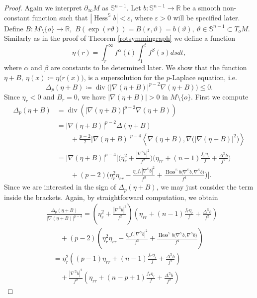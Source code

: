 \documentclass[10pt,a4paper,reqno]{amsart}
\newcommand{\R}{\mathbb{R}}
\newcommand{\Ss}{\mathbb{S}}
\newcommand{\ang}[1]{\left\langle #1 \right\rangle}
\DeclareMathOperator\dv{div}
\newcommand{\pinf}{\partial_{\infty}}
\DeclareMathOperator\Hess{Hess}
\numberwithin{equation}{section}
\theoremstyle{plain}
\theoremstyle{definition}
\begin{document}
\begin{proof}
 Again we interpret $\pinf M$ as $\Ss^{n-1}$. Let $b\colon \Ss^{n-1} \to \R$ be a smooth non-constant 
 function such that $|\Hess^{\Ss}b|<\varepsilon$, where $\varepsilon>0$ will be specified later. 
 Define $B\colon M \setminus 
\{o\} \to \R,$ $B(\exp(r\vartheta))=B(r,\vartheta) = b(\vartheta), \, \vartheta \in \Ss^{n-1}\subset T_oM$.
 Similarly as in the proof of Theorem \ref{rotsymmingraph} we define a function
    \[
     \eta(r) = \int_r^\infty f^\alpha(t) \int_1^t f^\beta(s)ds dt,
    \]
where $\alpha$ and $\beta$ are constants to be determined later. We show that the function $\eta + B,\ \eta(x)\coloneqq \eta\bigl(r(x)\bigr)$,  
is a supersolution for the $p$-Laplace equation, i.e.
\[
\Delta_p(\eta+B)\coloneqq \dv\bigl(|\nabla(\eta+B)|^{p-2}\nabla(\eta+B)\bigr)\le 0.
\] 
Since $\eta_r<0$ and $B_r=0$, we have $|\nabla(\eta+B)|>0$ in $M\setminus\{o\}$. 
First we compute
\begin{align*}
 \Delta_p (\eta +B) &
 = \dv (|\nabla (\eta +B)|^{p-2} \nabla (\eta +B))\\
 &= |\nabla (\eta +B)|^{p-2}  \Delta (\eta +B) \\
 &\qquad + \frac{p-2}{2}|\nabla(\eta+B)|^{p-4} \ang{\nabla(\eta +B), \nabla \bigl(|\nabla (\eta +B)|^2\bigr)}\\
 &= |\nabla (\eta +B)|^{p-4}
 \bigg[\bigg(\eta_r^2 + \frac{|\nabla^{\Ss}b|^2}{f^2}\bigg)\bigg(\eta_{rr}+(n-1)\frac{f_r\eta_r}{f} +\frac{\Delta^{\Ss}b}{f^2}\bigg)\\
&\qquad +(p-2)\bigg(\eta_r^2\eta_{rr}-\frac{\eta_r f_r |\nabla^{\Ss}b|^2}{f^3} + 
\frac{\Hess^{\Ss}b\bigl(\nabla^{\Ss}b,\nabla^{\Ss}b\bigr)}{f^4}\bigg)\bigg].
\end{align*}
Since we are interested in the sign of $\Delta_p(\eta+B)$, we may just consider the term inside the brackets. 
Again, by straightforward computation, we obtain
  \begin{align*}
& \frac{\Delta_p (\eta +B)}{|\nabla (\eta +B)|^{p-4}} = 
\left(\eta_r^2 + \frac{|\nabla^{\Ss}b|^2}{f^2}\right)\left(\eta_{rr}+(n-1)\frac{f_r\eta_r}{f} +\frac{\Delta^{\Ss}b}{f^2}\right)\\
&\qquad +(p-2)\left(\eta_r^2\eta_{rr}-\frac{\eta_r f_r |\nabla^{\Ss}b|^2}{f^3} +
\frac{\Hess^{\Ss}b\bigl(\nabla^{\Ss}b,\nabla^{\Ss}b\bigr)}{f^4} \right)\\   
&\quad =\eta_r^2\left((p-1)\eta_{rr} + (n-1)\frac{f_r\eta_r}{f} +  \frac{\Delta^{\Ss}b}{f^2}\right) \\
& \qquad + \frac{|\nabla^{\Ss}b|^2}{f^2}\left( \eta_{rr} + (n-p+1)\frac{f_r\eta_r}{f} +  \frac{\Delta^{\Ss}b}{f^2}\right)

\end{align*}
\end{proof}
\end{document}
